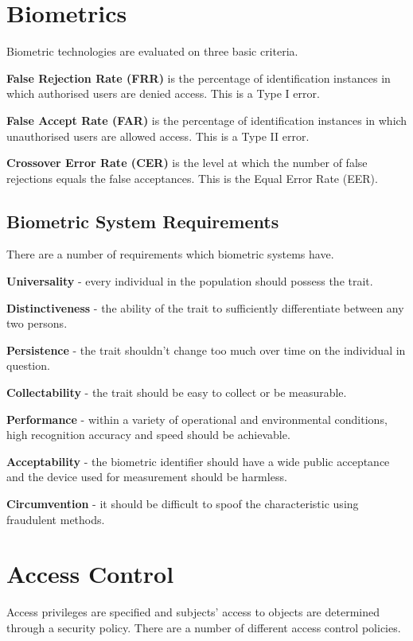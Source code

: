 \section*{Biometrics}
Biometric technologies are evaluated on three basic criteria.

\textbf{False Rejection Rate (FRR)} is the percentage of identification instances in which authorised users are denied access. This is a Type I error.

\textbf{False Accept Rate (FAR)} is the percentage of identification instances in which unauthorised users are allowed access. This is a Type II error.

\textbf{Crossover Error Rate (CER)} is the level at which the number of false rejections equals the false acceptances. This is the Equal Error Rate (EER).

\subsection*{Biometric System Requirements}
There are a number of requirements which biometric systems have.

\textbf{Universality} - every individual in the population should possess the trait.

\textbf{Distinctiveness} - the ability of the trait to sufficiently differentiate between any two persons.

\textbf{Persistence} - the trait shouldn't change too much over time on the individual in question.

\textbf{Collectability} - the trait should be easy to collect or be measurable.

\textbf{Performance} - within a variety of operational and environmental conditions, high recognition accuracy and speed should be achievable. 

\textbf{Acceptability} - the biometric identifier should have a wide public acceptance and the device used for measurement should be harmless.

\textbf{Circumvention} - it should be difficult to spoof the characteristic using fraudulent methods.

\section*{Access Control}
Access privileges are specified and subjects' access to objects are determined through a security policy. There are a number of different access control policies.

